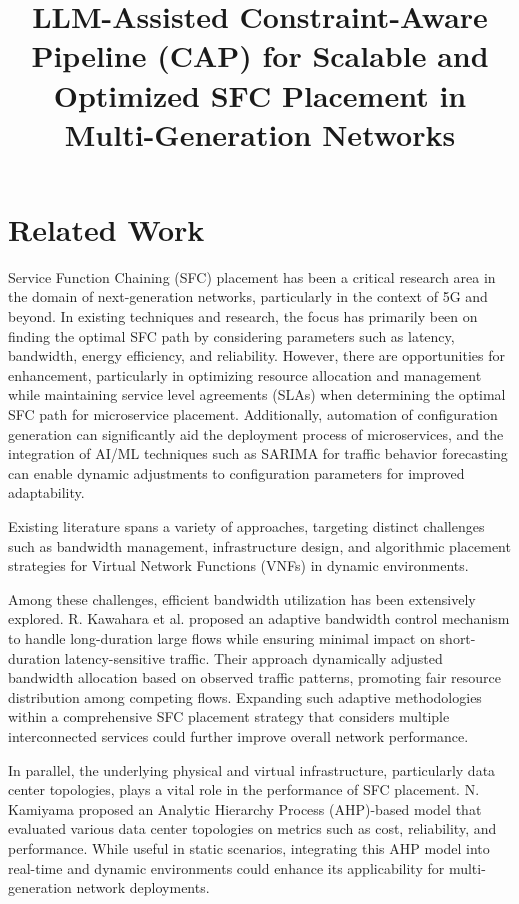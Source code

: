 \documentclass[conference]{IEEEtran}
\title{LLM-Assisted Constraint-Aware Pipeline (CAP) for Scalable and Optimized SFC Placement in Multi-Generation Networks}
\author{
	\IEEEauthorblockN{Author 1, Author 2, Author 3, Author 4}
	\IEEEauthorblockA{Department of Computer Science, University Name, Country\\
		Email: author1@example.com, author2@example.com, author3@example.com, author4@example.com}
}
\begin{document}
	
	\maketitle
	
	\section{Related Work}
	
	Service Function Chaining (SFC) placement has been a critical research area in the domain of next-generation networks, particularly in the context of 5G and beyond. In existing techniques and research, the focus has primarily been on finding the optimal SFC path by considering parameters such as latency, bandwidth, energy efficiency, and reliability. However, there are opportunities for enhancement, particularly in optimizing resource allocation and management while maintaining service level agreements (SLAs) when determining the optimal SFC path for microservice placement. Additionally, automation of configuration generation can significantly aid the deployment process of microservices, and the integration of AI/ML techniques such as SARIMA for traffic behavior forecasting can enable dynamic adjustments to configuration parameters for improved adaptability.
	
	Existing literature spans a variety of approaches, targeting distinct challenges such as bandwidth management, infrastructure design, and algorithmic placement strategies for Virtual Network Functions (VNFs) in dynamic environments.
	
	Among these challenges, efficient bandwidth utilization has been extensively explored. R. Kawahara et al. proposed an adaptive bandwidth control mechanism to handle long-duration large flows while ensuring minimal impact on short-duration latency-sensitive traffic. Their approach dynamically adjusted bandwidth allocation based on observed traffic patterns, promoting fair resource distribution among competing flows. Expanding such adaptive methodologies within a comprehensive SFC placement strategy that considers multiple interconnected services could further improve overall network performance.
	
	In parallel, the underlying physical and virtual infrastructure, particularly data center topologies, plays a vital role in the performance of SFC placement. N. Kamiyama proposed an Analytic Hierarchy Process (AHP)-based model that evaluated various data center topologies on metrics such as cost, reliability, and performance. While useful in static scenarios, integrating this AHP model into real-time and dynamic environments could enhance its applicability for multi-generation network deployments.
	
\end{document}
